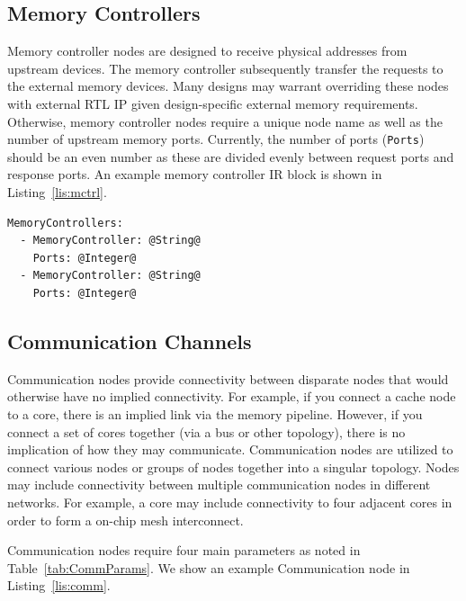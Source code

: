 \documentclass{article}
\begin{document}
\clearpage
\subsection{Memory Controllers}
\label{sec:MemCtrlNodes}

Memory controller nodes are designed to receive physical addresses from upstream devices.  The memory controller 
subsequently transfer the requests to the external memory devices.  Many designs may warrant overriding these nodes 
with external RTL IP given design-specific external memory requirements.  Otherwise, memory controller nodes require 
a unique node name as well as the number of upstream memory ports.  Currently, the number of ports (\texttt{Ports}) should be an even 
number as these are divided evenly between request ports and response ports.  An example memory controller IR block is 
shown in Listing~\ref{lis:mctrl}.  

\vspace{0.125in}
\begin{lstlisting}[frame=single,style=base,caption={Memory Controller Node Definition},captionpos=b,label={lis:mctrl}]
MemoryControllers:
  - MemoryController: @String@
    Ports: @Integer@
  - MemoryController: @String@
    Ports: @Integer@
\end{lstlisting}

\clearpage
\subsection{Communication Channels}
\label{sec:CommNodes}

Communication nodes provide connectivity between disparate nodes that would otherwise have no implied 
connectivity.  For example, if you connect a cache node to a core, there is an implied link via the memory pipeline.  However, 
if you connect a set of cores together (via a bus or other topology), there is no implication of how they may communicate.  
Communication nodes are utilized to connect various nodes or groups of nodes together into a singular topology.  Nodes may 
include connectivity between multiple communication nodes in different networks.  For example, a core may include connectivity 
to four adjacent cores in order to form a on-chip mesh interconnect.  

Communication nodes require four main parameters as noted in Table~\ref{tab:CommParams}.  We show an example Communication 
node in Listing~\ref{lis:comm}.    
\end{document}
